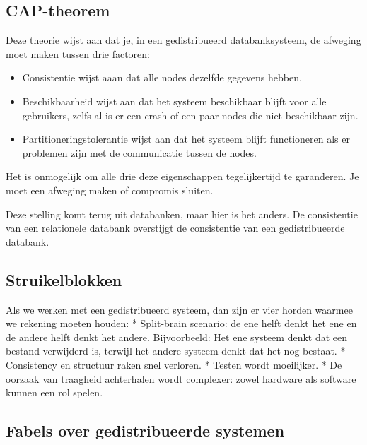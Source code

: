 \documentclass[a4paper,10pt,twoside]{report}
\begin{document}
\subsection{CAP-theorem}

Deze theorie wijst aan dat je, in een gedistribueerd databanksysteem, de afweging moet maken tussen drie factoren:

\begin{itemize}
	\item Consistentie wijst aaan dat alle nodes dezelfde gegevens hebben.
	\item Beschikbaarheid wijst aan dat het systeem beschikbaar blijft voor alle gebruikers, zelfs al is er een crash of een paar nodes die niet beschikbaar zijn.
	\item Partitioneringstolerantie wijst aan dat het systeem blijft functioneren als er problemen zijn met de communicatie tussen de nodes.
\end{itemize}

Het is onmogelijk om alle drie deze eigenschappen tegelijkertijd te garanderen. Je moet een afweging maken of compromis sluiten.

Deze stelling komt terug uit databanken, maar hier is het anders. De consistentie van een relationele databank overstijgt de consistentie van een gedistribueerde databank.

\subsection{Struikelblokken}

Als we werken met een gedistribueerd systeem, dan zijn er vier horden waarmee we rekening moeten houden:
* Split-brain scenario: de ene helft denkt het ene en de andere helft denkt het andere. Bijvoorbeeld: Het ene systeem denkt dat een bestand verwijderd is, terwijl het andere systeem denkt dat het nog bestaat.
* Consistency en structuur raken snel verloren.
* Testen wordt moeilijker.
* De oorzaak van traagheid achterhalen wordt complexer: zowel hardware als software kunnen een rol spelen.

\subsection{Fabels over gedistribueerde systemen}
\end{document}

